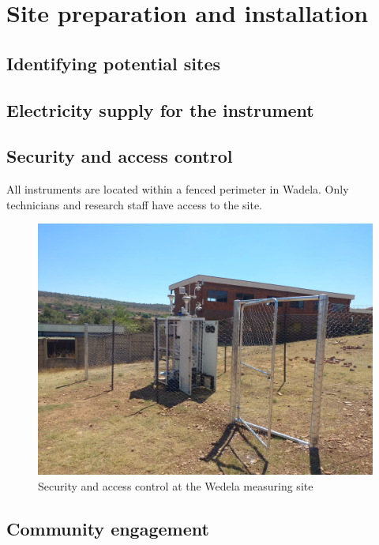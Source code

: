 \documentclass{nwureport}
\begin{document}

\chapter{Site preparation and installation}

\section{Identifying potential sites}

\section{Electricity supply for the instrument}

\section{Security and access control}
All instruments are located within a fenced perimeter in Wadela. Only technicians and
research staff have access to the site.

\begin{figure}[!htb]
    \centering
    \includegraphics[width=\textwidth]{images/wedela_4.jpeg}
    \caption[Security and access control at the Wedela measuring site]{Security and access control at the Wedela measuring site}
    \label{fig:wadela_fence}
\end{figure}

\section{Community engagement}
\end{document}
